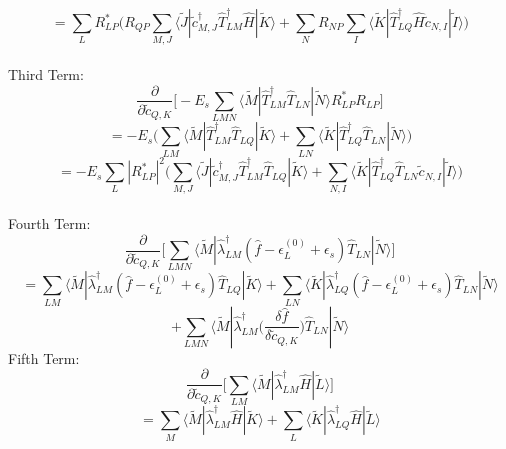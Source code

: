 \documentclass[12pt]{article}
\begin{document}
\begin{equation}
=\sum_{L}R^{*}_{LP}\Bigg(
 R_{QP}\sum_{M,J}\langle\tilde{J}|\tilde{c}_{M,J}^{\dagger}\hat{T}_{LM}^{\dagger}\hat{H}|\tilde{K}\rangle 
+\sum_{N}R_{NP}\sum_{I}\langle\tilde{K}|\hat{T}_{LQ}^{\dagger}\hat{H}\tilde{c}_{N,I}|\tilde{I}\rangle 
\Bigg)
\end{equation}
\\
Third Term:
\begin{equation*}
 \frac{\partial}{\partial \tilde{c}_{Q,K}}\Bigg[
-E_{s}\sum_{LMN}\langle\tilde{M}|\hat{T}_{LM}^{\dagger}\hat{T}_{LN}|\tilde{N}\rangle R^{*}_{LP}R_{LP}
\Bigg]
\end{equation*}
\begin{equation*}
=-E_{s}\Bigg(
 \sum_{LM}\langle\tilde{M}|\hat{T}_{LM}^{\dagger}\hat{T}_{LQ}|\tilde{K}\rangle 
+\sum_{LN}\langle\tilde{K}|\hat{T}_{LQ}^{\dagger}\hat{T}_{LN}|\tilde{N}\rangle 
\Bigg)
\end{equation*}
\begin{equation}
=-E_{s} \sum_{L}|R^{*}_{LP}|^{2}\Bigg(
 \sum_{M,J}\langle\tilde{J}|\tilde{c}_{M,J}^{\dagger}\hat{T}_{LM}^{\dagger}\hat{T}_{LQ}|\tilde{K}\rangle 
+\sum_{N,I}\langle\tilde{K}|                         \hat{T}_{LQ}^{\dagger}\hat{T}_{LN}\tilde{c}_{N,I}|\tilde{I}\rangle 
\Bigg)
\end{equation}
\\
Fourth Term:
\begin{equation*}
 \frac{\partial}{\partial \tilde{c}_{Q,K}}\Bigg[
\sum_{LMN}\langle\tilde{M}|\hat{\lambda}_{LM}^{\dagger}(\hat{f}-\epsilon_{L}^{(0)}+\epsilon_{s})\hat{T}_{LN}|\tilde{N}\rangle
\Bigg]
\end{equation*}
\begin{equation*}
=\sum_{LM}\langle\tilde{M}|\hat{\lambda}_{LM}^{\dagger}(\hat{f}-\epsilon_{L}^{(0)}+\epsilon_{s})\hat{T}_{LQ}|\tilde{K}\rangle 
+\sum_{LN}\langle\tilde{K}|\hat{\lambda}_{LQ}^{\dagger}(\hat{f}-\epsilon_{L}^{(0)}+\epsilon_{s})\hat{T}_{LN}|\tilde{N}\rangle 
\end{equation*}
\begin{equation*}
+\sum_{LMN}\langle\tilde{M}|\hat{\lambda}_{LM}^{\dagger}
\Big(\frac{\delta\hat{f}}{\delta \tilde{c}_{Q,K}}\Big)\hat{T}_{LN}|\tilde{N}\rangle
\end{equation*}
Fifth Term:
\begin{equation}
 \frac{\partial}{\partial \tilde{c}_{Q,K}}\Bigg[
\sum_{LM}\langle\tilde{M}|\hat{\lambda}_{LM}^{\dagger}\hat{H}|\tilde{L}\rangle
\Bigg]
\end{equation}
\begin{equation*}
=\sum_{M}\langle\tilde{M}|\hat{\lambda}_{LM}^{\dagger}\hat{H}|\tilde{K}\rangle 
+\sum_{L}\langle\tilde{K}|\hat{\lambda}_{LQ}^{\dagger}\hat{H}|\tilde{L}\rangle 
\end{equation*}
\end{document}
